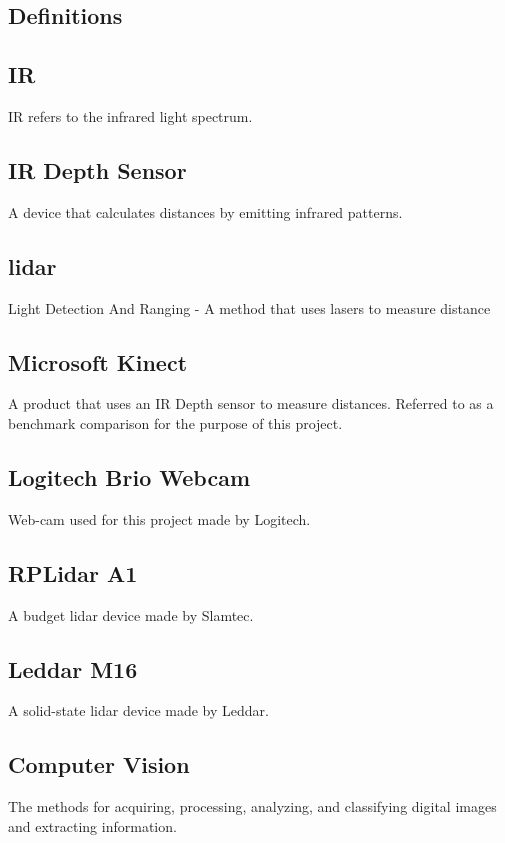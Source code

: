 \documentclass[onecolumn, draftclsnofoot,10pt, compsoc]{IEEEtran}
\begin{document}
\begin{singlespace}
	\section{Definitions}
		\subsection{IR}\label{def:IR}
		IR refers to the infrared light spectrum.

		\subsection{IR Depth Sensor}\label{def:depthsensor}
		A device that calculates distances by emitting infrared patterns. 
		
		\subsection{lidar}\label{def:lidar}
		Light Detection And Ranging - A method that uses lasers to measure distance
		
		\subsection{Microsoft Kinect}\label{def:kinect}
		A product that uses an IR Depth sensor to measure distances.
		Referred to as a benchmark comparison for the purpose of this project.
		
		\subsection{Logitech Brio Webcam}\label{def:brio}
		Web-cam used for this project made by Logitech. \cite{logitech}
		
		\subsection{RPLidar A1}\label{def:rplidar}
		A budget lidar device made by Slamtec. \cite{slamtec}

		\subsection{Leddar M16}\label{def:m16}
		A solid-state lidar device made by Leddar. \cite{leddartech}

		\subsection{Computer Vision }\label{def:vision}
		The methods for acquiring, processing, analyzing, and classifying digital images and extracting information.


\end{singlespace}
\end{document}
